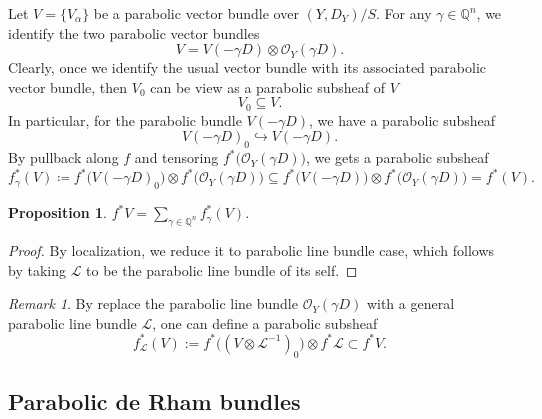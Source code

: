 \documentclass[12pt,twoside]{book}
\theoremstyle{plain}
\newtheorem{proposition}[proposition]{Proposition}
\theoremstyle{definition}
\theoremstyle{remark}
\newtheorem{remark}[remark]{Remark}
\newcommand{\bQ}{{\mathbb Q}}
\newcommand{\mL}{{\mathcal L}}
\newcommand{\mO}{{\mathcal O}}
\numberwithin{equation}{section}
\begin{document}
Let $V=\{V_\alpha\}$ be a parabolic vector bundle over $(Y,D_Y)/S$. For any $\gamma\in\bQ^n$, we identify the two parabolic vector bundles
\[V = V(-\gamma D)\otimes\mO_Y(\gamma D).\]
Clearly, once we identify the usual vector bundle with its associated parabolic vector bundle, then $V_0$ can be view as a parabolic subsheaf of $V$
\[V_0 \subseteq V.\]
In particular, for the parabolic bundle $V(-\gamma D)$, we have a parabolic subsheaf
\[V(-\gamma D)_0\hookrightarrow V(-\gamma D).\]
By pullback along $f$ and tensoring $f^*\Big(\mO_Y(\gamma D)\Big)$, we gets a parabolic subsheaf
\[f^*_{\gamma}(V)\coloneqq f^*\Big(V(-\gamma D)_0\Big)\otimes f^*\Big(\mO_Y(\gamma D)\Big) \subseteq f^*\Big(V(-\gamma D)\Big)\otimes f^*\Big(\mO_Y(\gamma D)\Big) = f^*(V).\]

\begin{proposition} \label{prop:PullbackParabolicBundles}
$f^*V = \sum\limits_{\gamma\in\bQ^n} f^*_{\gamma}(V)$.
\end{proposition}

\begin{proof}
By localization, we reduce it to parabolic line bundle case, which follows by taking $\mL$ to be the parabolic line bundle of its self.
\end{proof}

\begin{remark}
By replace the parabolic line bundle $\mO_Y(\gamma D)$ with a general parabolic line bundle $\mL$, one can define a parabolic subsheaf
\[f_{\mL}^*(V):= f^*\Big((V\otimes\mL^{-1})_0\Big) \otimes f^*\mL \subset f^*V.\]
\end{remark}

\subsection{Parabolic de Rham bundles}
\end{document}
